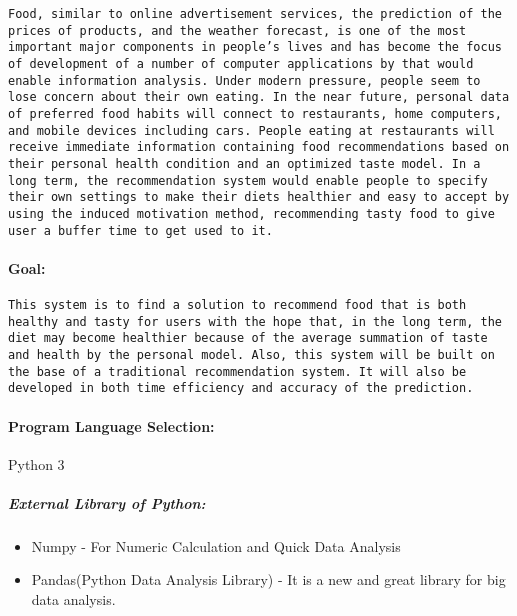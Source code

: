 \documentclass[11pt]{article}
\providecommand{\tightlist}{%
      \setlength{\itemsep}{0pt}\setlength{\parskip}{0pt}}
\begin{document}
\begin{verbatim}
Food, similar to online advertisement services, the prediction of the prices of products, and the weather forecast, is one of the most important major components in people’s lives and has become the focus of development of a number of computer applications by that would enable information analysis. Under modern pressure, people seem to lose concern about their own eating. In the near future, personal data of preferred food habits will connect to restaurants, home computers, and mobile devices including cars. People eating at restaurants will receive immediate information containing food recommendations based on their personal health condition and an optimized taste model. In a long term, the recommendation system would enable people to specify their own settings to make their diets healthier and easy to accept by using the induced motivation method, recommending tasty food to give user a buffer time to get used to it.
\end{verbatim}

\paragraph{Goal:}\label{goal}

\begin{verbatim}
This system is to find a solution to recommend food that is both healthy and tasty for users with the hope that, in the long term, the diet may become healthier because of the average summation of taste and health by the personal model. Also, this system will be built on the base of a traditional recommendation system. It will also be developed in both time efficiency and accuracy of the prediction.
\end{verbatim}

    \paragraph{Program Language
Selection:}\label{program-language-selection}

Python 3

\subparagraph{External Library of
Python:}\label{external-library-of-python}

\begin{itemize}
\tightlist
\item
  Numpy - For Numeric Calculation and Quick Data Analysis
\item
  Pandas(Python Data Analysis Library) - It is a new and great library
  for big data analysis.
\end{itemize}
\end{document}
